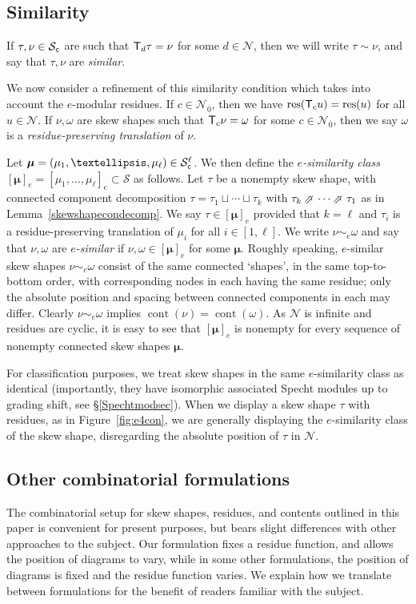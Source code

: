 \documentclass[Unicode,ALCO]{cedram}
\newcommand{\res}{\operatorname{res}}
\newcommand{\N}{\mathcal{N}}
\newcommand{\SSSS}{\mathcal{S}}
\newcommand{\0}{{\bar 0}}
\newcommand{\NEarrow}{\mathbin{\rotatebox[origin=c]{45}{$\Rightarrow$}}}
\newcommand{\T}{{\sf T}}
\newcommand{\bmu}{\boldsymbol{\mu}}
\def\cont{{\operatorname{cont}}}
\begin{document}
\subsection{Similarity}\label{similaritysec}
If \(\tau, \nu \in \SSSS_{\tt c}\) are such that \(\T_d \tau = \nu\) for some \(d \in \N\), then we will write \(\tau \sim \nu\), and say that \(\tau, \nu\) are {\em similar}.

We now consider a refinement of this similarity condition which takes into account the \(e\)-modular residues.
If \(c \in \N_{\overline 0}\), then we have \(\res(\T_c u) = \res(u)\) for all \(u \in \N\). If \(\nu, \omega\) are skew shapes such that \(\T_c \nu= \omega\) for some \(c \in \N_{\overline{0}}\), then we say \(\omega\) is a {\em residue-preserving translation} of \(\nu\).

Let \(\bmu = (\mu_1, \ldots, \mu_\ell) \in \SSSS_{\tt c}^\ell\). We then define the {\em \(e\)-similarity class} \([\bmu]_e = [\mu_1, \ldots, \mu_\ell]_e \subset \SSSS\) as follows. Let \(\tau\) be a nonempty skew shape, with connected component decomposition \(\tau = \tau_1 \sqcup \cdots \sqcup \tau_k\) with \(\tau_k \NEarrow \cdots \NEarrow \tau_1\) as in Lemma~\ref{skewshapecondecomp}. We say \(\tau \in [\bmu]_e\) provided that \(k = \ell\) and \(\tau_i\) is a residue-preserving translation of \(\mu_i\) for all \(i \in [1,\ell]\). We write \(\nu \sim_e \omega\) and say that \(\nu, \omega\) are {\em \(e\)-similar} if \(\nu,\omega \in [\bmu]_e\) for some \(\bmu\). Roughly speaking, 
\(e\)-similar skew shapes \(\nu\sim_e\omega\) consist of the same connected `shapes', in the same top-to-bottom order, with corresponding nodes in each having the same residue; only the absolute position and spacing between connected components in each may differ. Clearly \(\nu \sim_e \omega\) implies \(\cont(\nu) = \cont(\omega)\). As \(\N\) is infinite and residues are cyclic, it is easy to see that \([\bmu]_e\) is nonempty for every sequence of nonempty connected skew shapes \(\bmu\).

For classification purposes, we treat skew shapes in the same \(e\)-similarity class as identical (importantly, they have isomorphic associated Specht modules up to grading shift, see \S\ref{Spechtmodsec}).
When we display a skew shape \(\tau\) with residues, as in Figure~\ref{fig:e4con}, we are generally displaying the \(e\)-similarity class of the skew shape, disregarding the absolute position of \(\tau\) in \(\N\).

\subsection{Other combinatorial formulations}\label{otherformsec}
The combinatorial setup for skew shapes, residues, and contents outlined in this paper is convenient for present purposes, but bears slight differences with other approaches to the subject. Our formulation fixes a residue function, and allows the position of diagrams to vary, while in some other formulations, the position of diagrams is fixed and the residue function varies. We explain how we translate between formulations for the benefit of readers familiar with the subject.
\end{document}
